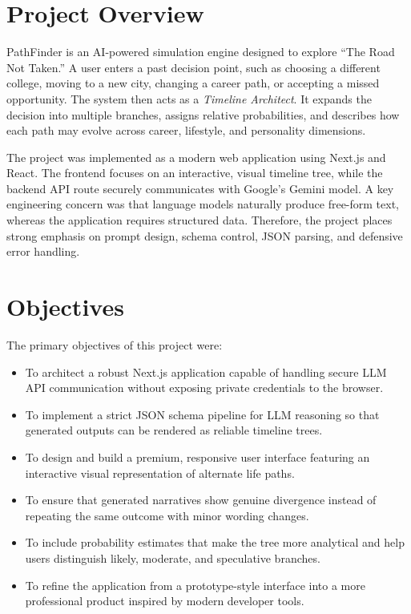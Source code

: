 \documentclass[12pt,a4paper]{report}
\begin{document}
\section{Project Overview}
PathFinder is an AI-powered simulation engine designed to explore ``The Road Not Taken.'' A user enters a past decision point, such as choosing a different college, moving to a new city, changing a career path, or accepting a missed opportunity. The system then acts as a \textit{Timeline Architect}. It expands the decision into multiple branches, assigns relative probabilities, and describes how each path may evolve across career, lifestyle, and personality dimensions.

The project was implemented as a modern web application using Next.js and React. The frontend focuses on an interactive, visual timeline tree, while the backend API route securely communicates with Google's Gemini model. A key engineering concern was that language models naturally produce free-form text, whereas the application requires structured data. Therefore, the project places strong emphasis on prompt design, schema control, JSON parsing, and defensive error handling.

\section{Objectives}
The primary objectives of this project were:
\begin{itemize}
    \item To architect a robust Next.js application capable of handling secure LLM API communication without exposing private credentials to the browser.
    \item To implement a strict JSON schema pipeline for LLM reasoning so that generated outputs can be rendered as reliable timeline trees.
    \item To design and build a premium, responsive user interface featuring an interactive visual representation of alternate life paths.
    \item To ensure that generated narratives show genuine divergence instead of repeating the same outcome with minor wording changes.
    \item To include probability estimates that make the tree more analytical and help users distinguish likely, moderate, and speculative branches.
    \item To refine the application from a prototype-style interface into a more professional product inspired by modern developer tools.
\end{itemize}
\end{document}

